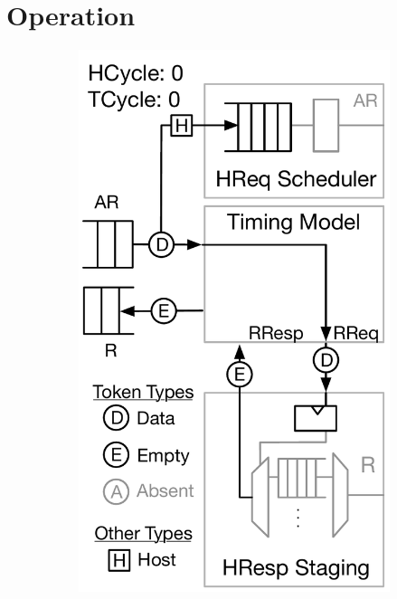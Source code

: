 \section{Operation}\label{sec:memory-model-operation}

\begin{figure}[t]
	\centering
    \begin{subfigure}[t]{0.23\textwidth}
        \includegraphics[width=\columnwidth]{figures/model-operation-1.pdf}

\end{subfigure}
\end{figure}
